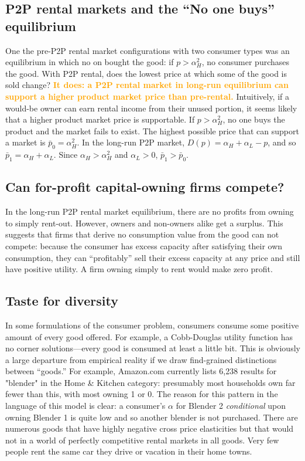 \documentclass[11pt]{article}
\newcommand{\important}[1]{\textcolor{orange}{\textbf{#1}}}
\begin{document}
\subsection{P2P rental markets and the ``No one buys'' equilibrium} 
One the pre-P2P rental market configurations with two consumer types was an equilibrium in which no on bought the good: 
if $p > \alpha_H^2$, no consumer purchases the good. 
With P2P rental, does the lowest price at which some of the good is sold change? 
\important{It does: a P2P rental market in long-run equilibrium can support a higher product market price than pre-rental.}  
Intuitively, if a would-be owner can earn rental income from their unused portion, it seems likely that a higher product market price is supportable. 
If $p > \alpha_H^2$, no one buys the product and the market fails to exist.
The highest possible price that can support a market is $\bar{p}_0 = \alpha_H^2$.  
In the long-run P2P market, $D(p) = \alpha_H + \alpha_L - p$, and so $\bar{p}_{1} = \alpha_H + \alpha_L$. 
Since $\alpha_H > \alpha_H^2$ and $\alpha_L > 0$, $\bar{p}_1 > \bar{p}_0$.  

\subsection{Can for-profit capital-owning firms compete?} 
In the long-run P2P rental market equilibrium, there are no profits from owning to simply rent-out. 
However, owners and non-owners alike get a surplus. 
This suggests that firms that derive no consumption value from the good can not compete: 
because the consumer has excess capacity after satisfying their own consumption, they can ``profitably'' sell 
their excess capacity at any price and still have positive utility. 
A firm owning simply to rent would make zero profit. 

\subsection{Taste for diversity} 
In some formulations of the consumer problem, consumers consume some positive amount of every good offered.
For example, a Cobb-Douglas utility function has no corner solutions---every good is consumed at least a little bit.
This is obviously a large departure from empirical reality if we draw find-grained distinctions between ``goods.'' 
For example, Amazon.com currently lists 6,238 results for "blender" in the Home \& Kitchen category: 
presumably most households own far fewer than this, with most owning 1 or 0.
The reason for this pattern in the language of this model is clear: 
a consumer's $\alpha$ for Blender 2 \emph{conditional} upon owning Blender 1 is quite low and so another blender is not purchased.   
There are numerous goods that have highly negative cross price elasticities but that would not in a world of perfectly competitive rental markets in all goods.  
Very few people rent the same car they drive or vacation in their home towns. 
     
\end{document}
